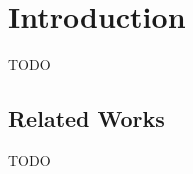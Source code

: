 \section{Introduction}
\label{sec:introduction}

TODO



\subsection{Related Works}
\label{subsec:introduction:related-works}

TODO

